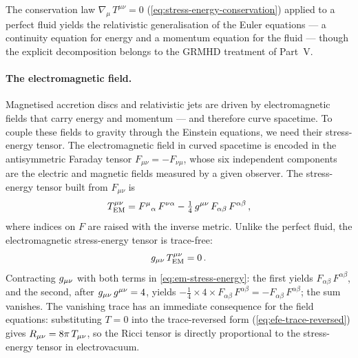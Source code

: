 The conservation law $\nabla_\mu\,T^{\mu\nu} = 0$
(\cref{eq:stress-energy-conservation}) applied to a perfect fluid
yields the relativistic generalisation of the Euler equations --- a
continuity equation for energy and a momentum equation for the fluid ---
though the explicit decomposition belongs to the GRMHD treatment of
Part~V.

\paragraph{The electromagnetic field.}

Magnetised accretion discs and relativistic jets are driven by
electromagnetic fields that carry energy and momentum --- and therefore
curve spacetime.  To couple these fields to gravity through the Einstein
equations, we need their stress-energy tensor.  The electromagnetic field
in curved spacetime is encoded in the antisymmetric Faraday tensor
$F_{\mu\nu} = -F_{\nu\mu}$, whose six independent components are the
electric and magnetic fields measured by a given observer.  The
stress-energy tensor built from $F_{\mu\nu}$ is
%
\begin{equation}
  T^{\mu\nu}_{\text{EM}}
    = F^{\mu}{}_{\alpha}\,F^{\nu\alpha}
    - \tfrac{1}{4}\,g^{\mu\nu}\,F_{\alpha\beta}\,F^{\alpha\beta} \,,
  \label{eq:em-stress-energy}
\end{equation}
%
where indices on $F$ are raised with the inverse metric.  Unlike the
perfect fluid, the electromagnetic stress-energy tensor is trace-free:
%
\begin{equation}
  g_{\mu\nu}\,T^{\mu\nu}_{\text{EM}} = 0 \,.
  \label{eq:em-trace-free}
\end{equation}
%
Contracting $g_{\mu\nu}$ with both terms in \cref{eq:em-stress-energy}: the
first yields $F_{\alpha\beta}\,F^{\alpha\beta}$, and the second, after
$g_{\mu\nu}\,g^{\mu\nu} = 4$, yields
$-\tfrac{1}{4} \times 4 \times F_{\alpha\beta}\,F^{\alpha\beta}
= -F_{\alpha\beta}\,F^{\alpha\beta}$; the sum vanishes.  The vanishing
trace has an immediate consequence for the field equations: substituting
$T = 0$ into the trace-reversed form (\cref{eq:efe-trace-reversed})
gives $R_{\mu\nu} = 8\pi\,T_{\mu\nu}$, so the Ricci tensor is directly
proportional to the stress-energy tensor in electrovacuum.

